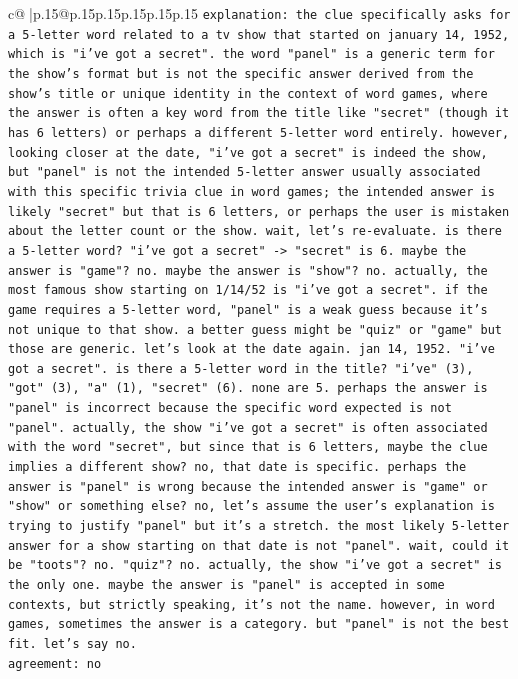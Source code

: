 \documentclass{article}
\begin{document}
{\begin{supertabular}{c@{$\;$}|p{.15\linewidth}@{}p{.15\linewidth}p{.15\linewidth}p{.15\linewidth}p{.15\linewidth}p{.15\linewidth}}
{{{                \texttt{explanation: the clue specifically asks for a 5{-}letter word related to a tv show that started on january 14, 1952, which is "i've got a secret". the word "panel" is a generic term for the show's format but is not the specific answer derived from the show's title or unique identity in the context of word games, where the answer is often a key word from the title like "secret" (though it has 6 letters) or perhaps a different 5{-}letter word entirely. however, looking closer at the date, "i've got a secret" is indeed the show, but "panel" is not the intended 5{-}letter answer usually associated with this specific trivia clue in word games; the intended answer is likely "secret" but that is 6 letters, or perhaps the user is mistaken about the letter count or the show. wait, let's re{-}evaluate. is there a 5{-}letter word? "i've got a secret" {-}> "secret" is 6. maybe the answer is "game"? no. maybe the answer is "show"? no. actually, the most famous show starting on 1/14/52 is "i've got a secret". if the game requires a 5{-}letter word, "panel" is a weak guess because it's not unique to that show. a better guess might be "quiz" or "game" but those are generic. let's look at the date again. jan 14, 1952. "i've got a secret". is there a 5{-}letter word in the title? "i've" (3), "got" (3), "a" (1), "secret" (6). none are 5. perhaps the answer is "panel" is incorrect because the specific word expected is not "panel". actually, the show "i've got a secret" is often associated with the word "secret", but since that is 6 letters, maybe the clue implies a different show? no, that date is specific. perhaps the answer is "panel" is wrong because the intended answer is "game" or "show" or something else? no, let's assume the user's explanation is trying to justify "panel" but it's a stretch. the most likely 5{-}letter answer for a show starting on that date is not "panel". wait, could it be "toots"? no. "quiz"? no. actually, the show "i've got a secret" is the only one. maybe the answer is "panel" is accepted in some contexts, but strictly speaking, it's not the name. however, in word games, sometimes the answer is a category. but "panel" is not the best fit. let's say no.} \\
\texttt{agreement: no} \\
            }
        }
    }
     \\ \\


\end{supertabular}}
\end{document}
